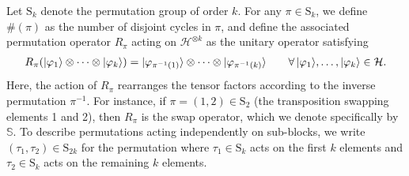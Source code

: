 \documentclass[aps,prl,twocolumn,nofootinbib,superscriptaddress,10pt]{revtex4-2}
\let\originalleft\left
\let\originalright\right
\renewcommand{\left}{\mathopen{}\mathclose\bgroup\originalleft}
\renewcommand{\right}{\aftergroup\egroup\originalright}
\theoremstyle{plain}
\theoremstyle{definition}
\begin{document}
Let \( \mathrm{S}_k \) denote the permutation group of order \( k \). For any \( \pi \in \mathrm{S}_k \), we define $\#(\pi)$ as the number of disjoint cycles in $\pi$, 
and define the associated permutation operator \( R_\pi \) acting on \( \mathcal{H}^{\otimes k} \) as the unitary operator satisfying  
\begin{align}
R_\pi \left( |\varphi_1\rangle \otimes \cdots \otimes |\varphi_k\rangle \right) 
= |\varphi_{\pi^{-1}(1)}\rangle \otimes \cdots \otimes |\varphi_{\pi^{-1}(k)}\rangle\qquad 
\forall \, |\varphi_1\rangle, \ldots, |\varphi_k\rangle \in \mathcal{H}. 
\end{align}
Here, the action of \( R_\pi \) rearranges the tensor factors according to the inverse permutation \( \pi^{-1} \). For instance, if \( \pi = (1,2) \in \mathrm{S}_2 \) (the transposition swapping elements 1 and 2), then \( R_{\pi} \) is the swap operator, which we denote specifically by $\mathbb{S}$. 
To describe permutations acting independently on sub-blocks, we write \((\tau_1, \tau_2) \in \mathrm{S}_{2k}\) for the permutation where \(\tau_1 \in \mathrm{S}_k\) acts on the first \(k\) elements and \(\tau_2 \in \mathrm{S}_k\) acts on the remaining \(k\) elements.  
\end{document}
